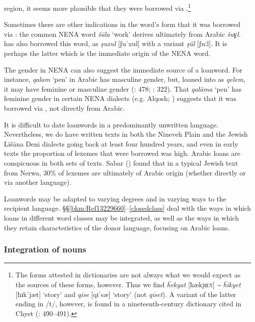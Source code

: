 \documentclass[output=paper]{langsci/langscibook}
\begin{document}
region, it seems more plausible that they were borrowed via .\footnote{The  forms attested in dictionaries are not always what we would expect as the sources of these forms, however. Thus we find \textit{ḧekyat} [ħækjɑːt] \textit{{\textasciitilde} ḧikyet} [ħɪk\textrm{ˈ}jæt] ‘story’  and \textit{qise} [qɪ\textrm{ˈ}sæ] ‘story’ (not \textit{qiset}). A variant of the latter ending in /t/, however, is found in a nineteenth-century dictionary cited in Chyet (\citeyear{Chyet2003}: 490–491).}

Sometimes there are other indications in the word’s form that it was borrowed via : the common NENA word \textit{šūla} ‘work’ derives ultimately from Arabic \textit{šuɣl}.  has also borrowed this word, as \textit{şuxul} [ʃuˈxul] with a variant \textit{şûl} [ʃuːl]. It is perhaps the latter which is the immediate origin of the NENA word.

The {gender} in NENA can also suggest the immediate source of a {loanword}. For instance, \textit{qalam} ‘pen’ in Arabic has masculine {gender}, but, loaned into  as \textit{qelem}, it may have feminine or masculine {gender} (\citealt{Chyet2003}: 478; \citealt{Rizgar1993}: 322). That \textit{qalāma} ‘pen’ has feminine {gender} in certain NENA dialects (e.g. Alqosh; \citealt[199]{Coghill2004}) suggests that it was borrowed via , not directly from Arabic.

It is difficult to date {loanwords} in a predominantly unwritten language. Nevertheless, we do have written texts in both the  Nineveh Plain and the Jewish Lišāna Deni dialects going back at least four hundred years, and even in early texts the proportion of lexemes that were borrowed was high. Arabic loans are conspicuous in both sets of texts. Sabar (\citeyear[208]{Sabar1984}) found that in a typical Jewish text from Nerwa, 30\% of lexemes are ultimately of Arabic origin (whether directly or via another language).

Loanwords may be adapted to varying degrees and in varying ways to the {recipient language}. §§\ref{bkm:Ref13229660}–\ref{closedclass} deal with the ways in which loans in different word classes may be integrated, as well as the ways in which they retain characteristics of the donor language, {focusing} on Arabic loans.

\subsubsection{\label{bkm:Ref13229660}Integration of nouns}
\end{document}
